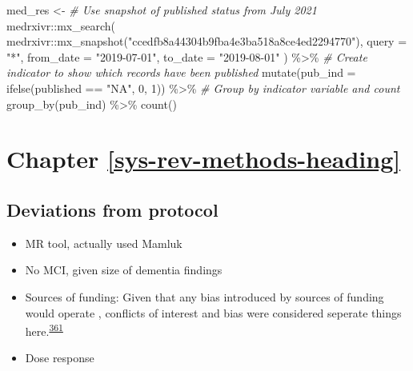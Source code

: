 \documentclass[a4paper, twoside]{templates/ociamthesis}
\newenvironment{Shaded}{\begin{snugshade}}{\end{snugshade}}
\newcommand{\AttributeTok}[1]{\textcolor[rgb]{0.77,0.63,0.00}{#1}}
\newcommand{\CommentTok}[1]{\textcolor[rgb]{0.56,0.35,0.01}{\textit{#1}}}
\newcommand{\DecValTok}[1]{\textcolor[rgb]{0.00,0.00,0.81}{#1}}
\newcommand{\FunctionTok}[1]{\textcolor[rgb]{0.00,0.00,0.00}{#1}}
\newcommand{\NormalTok}[1]{#1}
\newcommand{\OtherTok}[1]{\textcolor[rgb]{0.56,0.35,0.01}{#1}}
\newcommand{\SpecialCharTok}[1]{\textcolor[rgb]{0.00,0.00,0.00}{#1}}
\newcommand{\StringTok}[1]{\textcolor[rgb]{0.31,0.60,0.02}{#1}}
\renewenvironment{Shaded}
{
  \vspace{4pt}%
  \begin{snugshade}%
}{%
  \end{snugshade}%
  \vspace{4pt}%
}
\begin{document}
\begin{Shaded}
\begin{Highlighting}[]
\NormalTok{med\_res }\OtherTok{\textless{}{-}}
  \CommentTok{\# Use snapshot of published status from July 2021}
\NormalTok{  medrxivr}\SpecialCharTok{::}\FunctionTok{mx\_search}\NormalTok{(}
\NormalTok{    medrxivr}\SpecialCharTok{::}\FunctionTok{mx\_snapshot}\NormalTok{(}\StringTok{"ccedfb8a44304b9fba4e3ba518a8ce4ed2294770"}\NormalTok{),}
    \AttributeTok{query =} \StringTok{"*"}\NormalTok{,}
    \AttributeTok{from\_date =} \StringTok{"2019{-}07{-}01"}\NormalTok{,}
    \AttributeTok{to\_date =} \StringTok{"2019{-}08{-}01"}
\NormalTok{  ) }\SpecialCharTok{\%\textgreater{}\%}
  \CommentTok{\# Create indicator to show which records have been published}
  \FunctionTok{mutate}\NormalTok{(}\AttributeTok{pub\_ind =} \FunctionTok{ifelse}\NormalTok{(published }\SpecialCharTok{==} \StringTok{"NA"}\NormalTok{, }\DecValTok{0}\NormalTok{, }\DecValTok{1}\NormalTok{)) }\SpecialCharTok{\%\textgreater{}\%}
  \CommentTok{\# Group by indicator variable and count}
  \FunctionTok{group\_by}\NormalTok{(pub\_ind) }\SpecialCharTok{\%\textgreater{}\%}
  \FunctionTok{count}\NormalTok{() }
\end{Highlighting}
\end{Shaded}

\hypertarget{appendix-sys-rev}{%
\section{Chapter \ref{sys-rev-methods-heading}}\label{appendix-sys-rev}}

\hypertarget{deviations-from-protocol}{%
\subsection{Deviations from protocol}\label{deviations-from-protocol}}

\begin{itemize}
\item
  MR tool, actually used Mamluk
\item
  No MCI, given size of dementia findings
\item
  Sources of funding: Given that any bias introduced by sources of funding would operate , conflicts of interest and bias were considered seperate things here.\textsuperscript{\protect\hyperlink{ref-sterne2013}{361}}
\item
  Dose response
\end{itemize}
\end{document}
